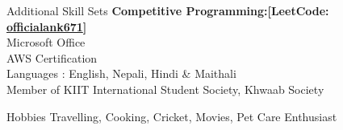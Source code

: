 \documentclass{resume} %
\begin{document}
\begin{rSection}{Additional Skill Sets}
\textbf{{Competitive Programming:\hspace{.5mm}[LeetCode:
\href{https://leetcode.com/u/officialank671/}{officialank671}}]} \\
{Microsoft Office} \\
{AWS Certification} \\
{Languages : English, Nepali, Hindi \& Maithali}\\
{Member of KIIT International Student Society, Khwaab Society}
\end{rSection} 
\begin{rSection}{Hobbies}
\vspace{0.5mm}
{Travelling, Cooking, Cricket, Movies, Pet Care Enthusiast}\\
\end{rSection}
\end{document}
